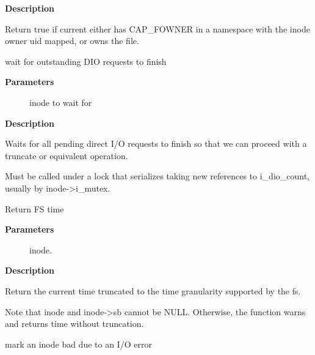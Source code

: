 \documentclass[a4paper,8pt,english]{sphinxmanual}
\begin{document}
\textbf{Description}

Return true if current either has CAP\_FOWNER in a namespace with the
inode owner uid mapped, or owns the file.

\begin{fulllineitems}
\label{filesystems/index:c.inode_dio_wait}
wait for outstanding DIO requests to finish

\end{fulllineitems}


\textbf{Parameters}
\begin{description}
\item[{}] \leavevmode
inode to wait for

\end{description}

\textbf{Description}

Waits for all pending direct I/O requests to finish so that we can
proceed with a truncate or equivalent operation.

Must be called under a lock that serializes taking new references
to i\_dio\_count, usually by inode-\textgreater{}i\_mutex.

\begin{fulllineitems}
\label{filesystems/index:c.current_time}
Return FS time

\end{fulllineitems}


\textbf{Parameters}
\begin{description}
\item[{}] \leavevmode
inode.

\end{description}

\textbf{Description}

Return the current time truncated to the time granularity supported by
the fs.

Note that inode and inode-\textgreater{}sb cannot be NULL.
Otherwise, the function warns and returns time without truncation.

\begin{fulllineitems}
\label{filesystems/index:c.make_bad_inode}
mark an inode bad due to an I/O error

\end{fulllineitems}
\end{document}
